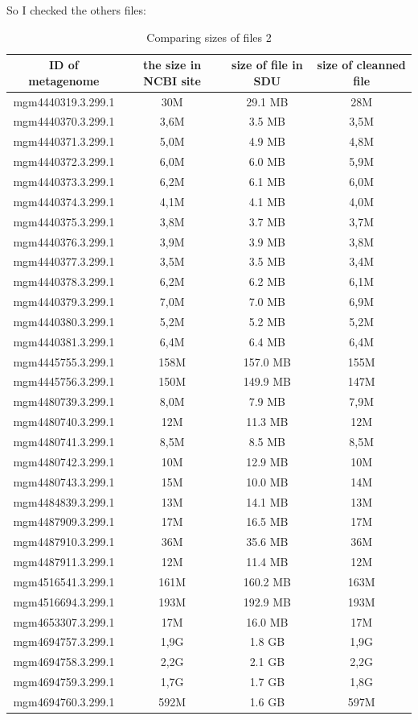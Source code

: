 \documentclass[12pt, a4paper]{report}
\begin{document}
So I checked the others files:

\begin{table}[!htb]
  \caption{Comparing sizes of files 2}
  \centering
  \begin{tabular}{cccc}
  \hline 
       ID of metagenome&the size in NCBI site&size of file in SDU&size of cleanned file\\
  \hline
	mgm4440319.3.299.1&30M&29.1 MB&28M\\
	mgm4440370.3.299.1&3,6M&3.5 MB&3,5M\\
	mgm4440371.3.299.1&5,0M&4.9 MB&4,8M\\
	mgm4440372.3.299.1&6,0M&6.0 MB&5,9M\\
	mgm4440373.3.299.1&6,2M&6.1 MB&6,0M\\
	mgm4440374.3.299.1&4,1M&4.1 MB&4,0M\\
	mgm4440375.3.299.1&3,8M&3.7 MB&3,7M\\
	mgm4440376.3.299.1&3,9M&3.9 MB&3,8M\\
	mgm4440377.3.299.1&3,5M&3.5 MB&3,4M\\
	mgm4440378.3.299.1&6,2M&6.2 MB&6,1M\\
	mgm4440379.3.299.1&7,0M&7.0 MB&6,9M\\
	mgm4440380.3.299.1&5,2M&5.2 MB&5,2M\\
	mgm4440381.3.299.1&6,4M&6.4 MB&6,4M\\
	mgm4445755.3.299.1&158M&157.0 MB&155M\\
	mgm4445756.3.299.1&150M&149.9 MB&147M\\
	mgm4480739.3.299.1&8,0M&7.9 MB&7,9M\\
	mgm4480740.3.299.1&12M&11.3 MB&12M\\
	mgm4480741.3.299.1&8,5M&8.5 MB&8,5M\\
	mgm4480742.3.299.1&10M&12.9 MB&10M\\
	mgm4480743.3.299.1&15M&10.0 MB&14M\\
	mgm4484839.3.299.1&13M&14.1 MB&13M\\
	mgm4487909.3.299.1&17M&16.5 MB&17M\\
	mgm4487910.3.299.1&36M&35.6 MB&36M\\
	mgm4487911.3.299.1&12M&11.4 MB&12M\\
	mgm4516541.3.299.1&161M&160.2 MB&163M\\
	mgm4516694.3.299.1&193M&192.9 MB&193M\\
	mgm4653307.3.299.1&17M&16.0 MB&17M\\
	mgm4694757.3.299.1&1,9G&1.8 GB&1,9G\\
	mgm4694758.3.299.1&2,2G&2.1 GB&2,2G\\
	mgm4694759.3.299.1&1,7G&1.7 GB&1,8G\\
	mgm4694760.3.299.1&592M&1.6 GB&597M\\
  \hline
  \end{tabular}
  \label{table3}
 \end{table}
\end{document}
